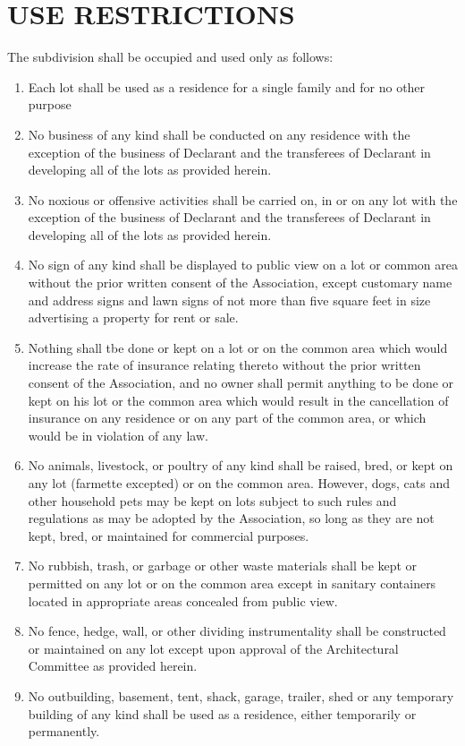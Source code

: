 \documentclass[12pt, letterpaper]{article}
\begin{document}
\section{USE RESTRICTIONS}
The subdivision shall be occupied and used only as follows:
\begin{enumerate}
\item Each lot shall be used as a residence for a single family and for no other purpose
\item No business of any kind shall be conducted on any residence with the exception of the business of Declarant and the transferees of Declarant in developing all of the lots as provided herein.
\item No noxious or offensive activities shall be carried on, in or on any lot with the exception of the business of Declarant and the transferees of Declarant in developing all of the lots as provided herein.
\item No sign of any kind shall be displayed to public view on a lot or common area without the prior written consent of the Association, except customary name and address signs and lawn signs of not more than five square feet in size advertising a property for rent or sale.
\item Nothing shall tbe done or kept on a lot or on the common area which would increase the rate of insurance relating thereto without the prior written consent of the Association, and no owner shall permit anything to be done or kept on his lot or the common area which would result in the cancellation of insurance on any residence or on any part of the common area, or which would be in violation of any law.
\item No animals, livestock, or poultry of any kind shall be raised, bred, or kept on any lot (farmette excepted) or on the common area.
However, dogs, cats and other household pets may be kept on lots subject to such rules and regulations as may be adopted by the Association, so long as they are not kept, bred, or maintained for commercial purposes.
\item No rubbish, trash, or garbage or other waste materials shall be kept or permitted on any lot or on the common area except in sanitary containers located in appropriate areas concealed from public view.
\item No fence, hedge, wall, or other dividing instrumentality shall be constructed or maintained on any lot except upon approval of the Architectural Committee as provided herein.
\item No outbuilding, basement, tent, shack, garage, trailer, shed or any temporary building of any kind shall be used as a residence, either temporarily or permanently.

\end{enumerate}
\end{document}
